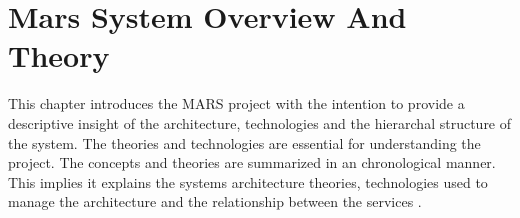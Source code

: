 \newpage
\chapter{Mars System Overview And Theory}

This chapter introduces the MARS project with the intention to provide a descriptive insight
of the architecture, technologies and the hierarchal structure of the system. The theories and
technologies are essential for understanding the project. The concepts and theories are summarized
in an chronological manner. This implies it explains the systems architecture theories,
technologies used to manage the architecture and the relationship between the services \cite{SOA}.

	
	